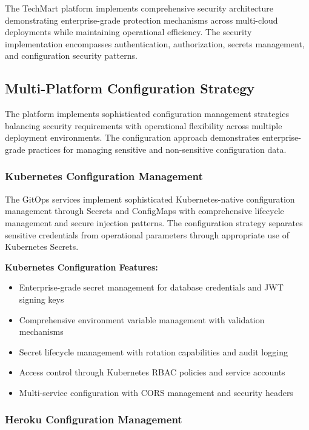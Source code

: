 The TechMart platform implements comprehensive security architecture demonstrating enterprise-grade protection mechanisms across multi-cloud deployments while maintaining operational efficiency. The security implementation encompasses authentication, authorization, secrets management, and configuration security patterns.

\subsection{Multi-Platform Configuration Strategy}

The platform implements sophisticated configuration management strategies balancing security requirements with operational flexibility across multiple deployment environments. The configuration approach demonstrates enterprise-grade practices for managing sensitive and non-sensitive configuration data.

\subsubsection{Kubernetes Configuration Management}

The GitOps services implement sophisticated Kubernetes-native configuration management through Secrets and ConfigMaps with comprehensive lifecycle management and secure injection patterns. The configuration strategy separates sensitive credentials from operational parameters through appropriate use of Kubernetes Secrets.

\textbf{Kubernetes Configuration Features:}
\begin{itemize}
\item Enterprise-grade secret management for database credentials and JWT signing keys
\item Comprehensive environment variable management with validation mechanisms
\item Secret lifecycle management with rotation capabilities and audit logging
\item Access control through Kubernetes RBAC policies and service accounts
\item Multi-service configuration with CORS management and security headers
\end{itemize}

\subsubsection{Heroku Configuration Management}

